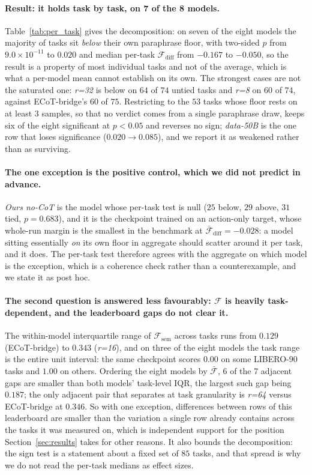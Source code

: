 \paragraph{Result: it holds task by task, on 7 of the 8 models.} Table~\ref{tab:per_task} gives the decomposition: on seven of the eight models the majority of tasks sit \emph{below} their own paraphrase floor, with two-sided $p$ from $9.0\!\times\!10^{-11}$ to $0.020$ and median per-task $\mathcal{F}_{\text{diff}}$ from $-0.167$ to $-0.050$, so the result is a property of most individual tasks and not of the average, which is what a per-model mean cannot establish on its own. The strongest cases are not the saturated one: \emph{r=32} is below on $64$ of $74$ untied tasks and \emph{r=8} on $60$ of $74$, against ECoT-bridge's $60$ of $75$. Restricting to the $53$ tasks whose floor rests on at least $3$ samples, so that no verdict comes from a single paraphrase draw, keeps six of the eight significant at $p<0.05$ and reverses no sign; \emph{data-50B} is the one row that loses significance ($0.020 \to 0.085$), and we report it as weakened rather than as surviving.

\paragraph{The one exception is the positive control, which we did not predict in advance.} \emph{Ours no-CoT} is the model whose per-task test is null ($25$ below, $29$ above, $31$ tied, $p = 0.683$), and it is the checkpoint trained on an action-only target, whose whole-run margin is the smallest in the benchmark at $\bar{\mathcal{F}}_{\text{diff}} = -0.028$: a model sitting essentially \emph{on} its own floor in aggregate should scatter around it per task, and it does. The per-task test therefore agrees with the aggregate on which model is the exception, which is a coherence check rather than a counterexample, and we state it as post hoc.

\paragraph{The second question is answered less favourably: $\mathcal{F}$ is heavily task-dependent, and the leaderboard gaps do not clear it.} The within-model interquartile range of $\mathcal{F}_{\text{sem}}$ across tasks runs from $0.129$ (ECoT-bridge) to $0.343$ (\emph{r=16}), and on three of the eight models the task range is the entire unit interval: the same checkpoint scores $0.00$ on some LIBERO-90 tasks and $1.00$ on others. Ordering the eight models by $\bar{\mathcal{F}}$, 6 of the 7 adjacent gaps are smaller than both models' task-level IQR, the largest such gap being $0.187$; the only adjacent pair that separates at task granularity is \emph{r=64} versus ECoT-bridge at $0.346$. So with one exception, differences between rows of this leaderboard are smaller than the variation a single row already contains across the tasks it was measured on, which is independent support for the position Section~\ref{sec:results} takes for other reasons. It also bounds the decomposition: the sign test is a statement about a fixed set of $85$ tasks, and that spread is why we do not read the per-task medians as effect sizes.

